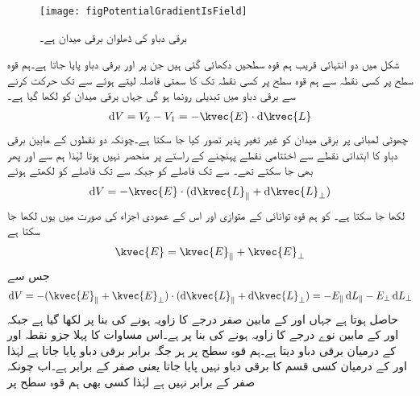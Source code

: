 \begin{figure}
\centering
\texttt{[image: figPotentialGradientIsField]}
\caption{برقی دباو کی ڈھلوان برقی میدان ہے۔}
\label{شکل_توانائی_دباو_ڈھلوان_میدان_ہے}
\end{figure}

شکل  میں دو انتہائی قریب  ہم قوہ  سطحیں دکھائی گئی ہیں جن پر  اور  برقی دباو پایا جاتا ہے۔ہم قوہ سطح  پر کسی نقطہ   سے ہم قوہ سطح  پر کسی نقطہ  تک  کا سمتی فاصلہ  لیتے ہوئے  سے   تک حرکت کرنے سے برقی دباو میں   تبدیلی رونما ہو گی جہاں برقی میدان کو  لکھا گیا ہے۔
\begin{align}\label{مساوات_توانائی_ہم_قوہ_سطح_اور_میدان}
\dif V=V_2-V_1=-\kvec{E} \cdot \dif \kvec{L}
\end{align}
چھوٹی لمبائی  پر برقی میدان کو غیر تغیر پذیر تصور کیا جا سکتا ہے۔چونکہ  دو نقطوں کے مابین برقی دباو کا ابتدائی نقطے سے اختتامی نقطے پہنچنے کے راستے پر منحصر نہیں ہوتا لہٰذا ہم  سے  اور پھر  بھی جا سکتے تھے۔ سے  تک فاصلے کو   جبکہ  سے  تک فاصلے کو   لکھتے ہوئے
\begin{align}
\dif V=-\kvec{E} \cdot (\dif \kvec{L}_\parallel+ \dif \kvec{L}_\perp)
\end{align}
لکھا جا سکتا ہے۔ کو  ہم قوہ توانائی کے متوازی  اور اس کے عمودی اجزاء کی صورت میں یوں لکھا جا سکتا ہے
\begin{align}
\kvec{E}=\kvec{E}_\parallel+\kvec{E}_\perp
\end{align}  
جس سے
\begin{align}
\dif V=-(\kvec{E}_\parallel+\kvec{E}_\perp) \cdot (\dif \kvec{L}_\parallel+ \dif \kvec{L}_\perp)=-{E}_\parallel \dif L_\parallel-E_\perp \dif L_\perp
\end{align}  
حاصل ہوتا ہے جہاں  اور  کے مابین صفر درجے کا زاویہ ہونے کی بنا پر 
  لکھا گیا ہے جبکہ  اور
  کے مابین نوے درجے کا زاویہ ہونے کی بنا پر  ہے۔اس مساوات کا پہلا جزو  نقطہ  اور  کے درمیان برقی دباو دیتا ہے۔ہم قوہ سطح پر ہر جگہ برابر برقی دباو پایا جاتا ہے لہٰذا  اور  کے درمیان کسی قسم کا برقی دباو نہیں پایا جاتا یعنی  صفر کے برابر ہے۔اب چونکہ  صفر کے برابر نہیں ہے لہٰذا کسی بھی ہم قوہ سطح پر

